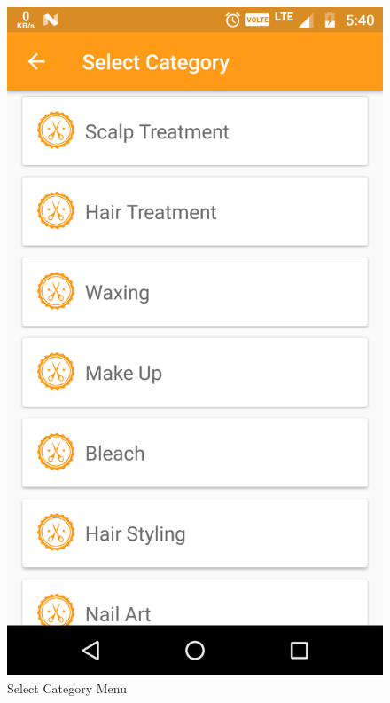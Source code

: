 \\
\begin{figure}[h]
	\centering
	\includegraphics[width=0.7\linewidth]{SelectCategoryMenu}
	\caption{Select Category Menu}
\end{figure}
\pagebreak


